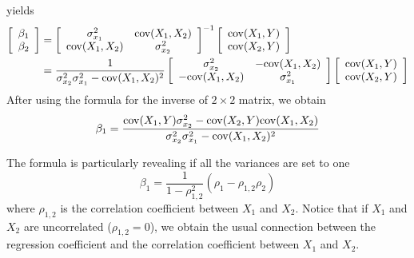 yields 
\begin{align*}
\left[\begin{array}{c}
\beta_1 \\
\beta_2 
\end{array}\right] &= \left[\begin{array}{cc}
\sigma_{x_1}^2 & {\rm cov}(X_1,X_2)\\
 {\rm cov}(X_1,X_2) & \sigma_{x_2}^2
 \end{array} \right]^{-1}\left[ \begin{array}{c}
 {\rm cov}(X_1,Y)\\
  {\rm cov}(X_2,Y)\\
  \end{array}\right]\\
  &=  \frac{1}{\sigma_{x_2}^2\sigma_{x_1}^2 -{\rm cov}(X_1,X_2)^2} \left[\begin{array}{cc}
\sigma_{x_2}^2 & -{\rm cov}(X_1,X_2)\\
- {\rm cov}(X_1,X_2) & \sigma_{x_1}^2
 \end{array} \right]\left[ \begin{array}{c}
 {\rm cov}(X_1,Y)\\
  {\rm cov}(X_2,Y)\\
  \end{array}\right]
\end{align*}
After using the formula for the inverse of $2\times 2$ matrix, we obtain 
\begin{align}\label{eq:beta1cov}
\beta_1 =     \frac{ {\rm cov}(X_1,Y)\sigma_{x_2}^2 - {\rm cov}(X_2,Y){\rm cov}(X_1,X_2)}{\sigma_{x_2}^2\sigma_{x_1}^2 -{\rm cov}(X_1,X_2)^2}
\end{align}

The formula is particularly revealing if all the variances are set to one
\begin{equation*}
\beta_1 = \frac{1}{1-\rho_{1,2}^2}(\rho_1 - \rho_{1,2}\rho_2)
\end{equation*}
where $\rho_{1,2}$ is the correlation coefficient between $X_1$ and $X_2$. Notice that if $X_1$ and $X_2$ are uncorrelated ($\rho_{1,2}=0$), we obtain the usual connection between the regression coefficient and the correlation coefficient between $X_1$ and $X_2$. 

